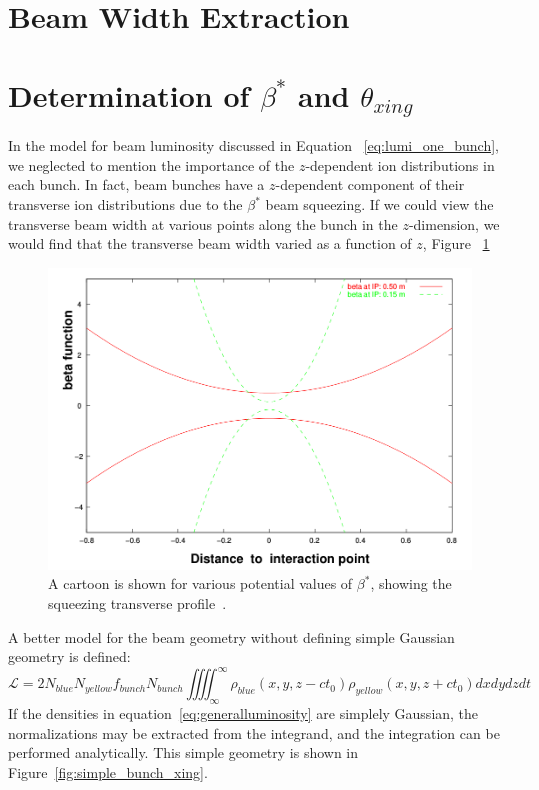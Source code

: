 \clearpage
\section{Beam Width Extraction}
\label{sec:beam_width}

\clearpage
\section{Determination of $\beta^*$ and $\theta_{xing}$}
\label{sec:hourglass_correction}

In the model for beam luminosity discussed in Equation ~\ref{eq:lumi_one_bunch},
we neglected to  mention the importance of the $z$-dependent ion distributions
in each bunch. In fact, beam bunches have a $z$-dependent component of their
transverse ion distributions due to the $\beta^*$ beam squeezing. If we could
view the transverse beam width at various points along the bunch in the
$z$-dimension, we would find that the transverse beam width varied as a function
of $z$, Figure ~\ref{fig:beta_squeeze}

\begin{figure}
  \centering
  \includegraphics[width=0.8\linewidth]{./figures/beta_function.png}
  \caption{
    A cartoon is shown for various potential values of $\beta^*$, showing the
    squeezing transverse profile~\cite{Herr2003a}.
  }
  \label{fig:beta_squeeze}

\end{figure}

A better model for the beam geometry without defining simple Gaussian geometry
is defined:
\begin{equation}
\label{eq:generalluminosity}
\mathcal{L} = 2N_{blue}N_{yellow}f_{bunch}N_{bunch}\iiiint _{\infty}^{ \infty}{
\rho_{blue} (x,y,z-ct_0)\rho_{yellow} (x,y,z+ct_0)} dxdydzdt
\end{equation}
If the densities in equation~\ref{eq:generalluminosity} are simplely Gaussian,
the normalizations may be extracted from the integrand, and the integration can
be performed analytically. This simple geometry is shown in
Figure~\ref{fig:simple_bunch_xing}.

